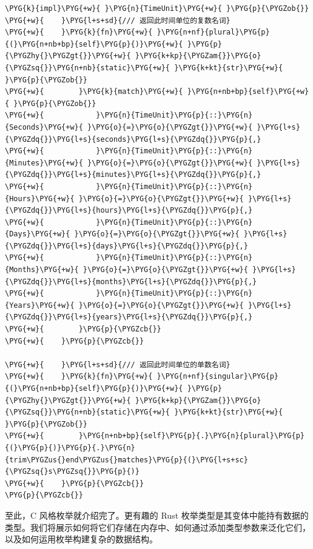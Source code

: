 \begin{Verbatim}[commandchars=\\\{\},breaklines=true,breakanywhere=true,fontsize=\codefont,xleftmargin=17bp]
\PYG{k}{impl}\PYG{+w}{ }\PYG{n}{TimeUnit}\PYG{+w}{ }\PYG{p}{\PYGZob{}}
\PYG{+w}{    }\PYG{l+s+sd}{/// 返回此时间单位的复数名词}
\PYG{+w}{    }\PYG{k}{fn}\PYG{+w}{ }\PYG{n+nf}{plural}\PYG{p}{(}\PYG{n+nb+bp}{self}\PYG{p}{)}\PYG{+w}{ }\PYG{p}{\PYGZhy{}\PYGZgt{}}\PYG{+w}{ }\PYG{k+kp}{\PYGZam{}}\PYG{o}{\PYGZsq{}}\PYG{n+nb}{static}\PYG{+w}{ }\PYG{k+kt}{str}\PYG{+w}{ }\PYG{p}{\PYGZob{}}
\PYG{+w}{        }\PYG{k}{match}\PYG{+w}{ }\PYG{n+nb+bp}{self}\PYG{+w}{ }\PYG{p}{\PYGZob{}}
\PYG{+w}{            }\PYG{n}{TimeUnit}\PYG{p}{::}\PYG{n}{Seconds}\PYG{+w}{ }\PYG{o}{=}\PYG{o}{\PYGZgt{}}\PYG{+w}{ }\PYG{l+s}{\PYGZdq{}}\PYG{l+s}{seconds}\PYG{l+s}{\PYGZdq{}}\PYG{p}{,}
\PYG{+w}{            }\PYG{n}{TimeUnit}\PYG{p}{::}\PYG{n}{Minutes}\PYG{+w}{ }\PYG{o}{=}\PYG{o}{\PYGZgt{}}\PYG{+w}{ }\PYG{l+s}{\PYGZdq{}}\PYG{l+s}{minutes}\PYG{l+s}{\PYGZdq{}}\PYG{p}{,}
\PYG{+w}{            }\PYG{n}{TimeUnit}\PYG{p}{::}\PYG{n}{Hours}\PYG{+w}{ }\PYG{o}{=}\PYG{o}{\PYGZgt{}}\PYG{+w}{ }\PYG{l+s}{\PYGZdq{}}\PYG{l+s}{hours}\PYG{l+s}{\PYGZdq{}}\PYG{p}{,}
\PYG{+w}{            }\PYG{n}{TimeUnit}\PYG{p}{::}\PYG{n}{Days}\PYG{+w}{ }\PYG{o}{=}\PYG{o}{\PYGZgt{}}\PYG{+w}{ }\PYG{l+s}{\PYGZdq{}}\PYG{l+s}{days}\PYG{l+s}{\PYGZdq{}}\PYG{p}{,}
\PYG{+w}{            }\PYG{n}{TimeUnit}\PYG{p}{::}\PYG{n}{Months}\PYG{+w}{ }\PYG{o}{=}\PYG{o}{\PYGZgt{}}\PYG{+w}{ }\PYG{l+s}{\PYGZdq{}}\PYG{l+s}{months}\PYG{l+s}{\PYGZdq{}}\PYG{p}{,}
\PYG{+w}{            }\PYG{n}{TimeUnit}\PYG{p}{::}\PYG{n}{Years}\PYG{+w}{ }\PYG{o}{=}\PYG{o}{\PYGZgt{}}\PYG{+w}{ }\PYG{l+s}{\PYGZdq{}}\PYG{l+s}{years}\PYG{l+s}{\PYGZdq{}}\PYG{p}{,}
\PYG{+w}{        }\PYG{p}{\PYGZcb{}}
\PYG{+w}{    }\PYG{p}{\PYGZcb{}}

\PYG{+w}{    }\PYG{l+s+sd}{/// 返回此时间单位的单数名词}
\PYG{+w}{    }\PYG{k}{fn}\PYG{+w}{ }\PYG{n+nf}{singular}\PYG{p}{(}\PYG{n+nb+bp}{self}\PYG{p}{)}\PYG{+w}{ }\PYG{p}{\PYGZhy{}\PYGZgt{}}\PYG{+w}{ }\PYG{k+kp}{\PYGZam{}}\PYG{o}{\PYGZsq{}}\PYG{n+nb}{static}\PYG{+w}{ }\PYG{k+kt}{str}\PYG{+w}{ }\PYG{p}{\PYGZob{}}
\PYG{+w}{        }\PYG{n+nb+bp}{self}\PYG{p}{.}\PYG{n}{plural}\PYG{p}{(}\PYG{p}{)}\PYG{p}{.}\PYG{n}{trim\PYGZus{}end\PYGZus{}matches}\PYG{p}{(}\PYG{l+s+sc}{\PYGZsq{}s\PYGZsq{}}\PYG{p}{)}
\PYG{+w}{    }\PYG{p}{\PYGZcb{}}
\PYG{p}{\PYGZcb{}}
\end{Verbatim}

至此，C 风格枚举就介绍完了。更有趣的 Rust 枚举类型是其变体中能持有数据的类型。我们将展示如何将它们存储在内存中、如何通过添加类型参数来泛化它们，以及如何运用枚举构建复杂的数据结构。

